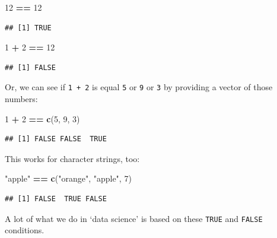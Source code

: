\documentclass[
]{book}
\newenvironment{Shaded}{\begin{snugshade}}{\end{snugshade}}
\newcommand{\DecValTok}[1]{\textcolor[rgb]{0.00,0.00,0.81}{#1}}
\newcommand{\KeywordTok}[1]{\textcolor[rgb]{0.13,0.29,0.53}{\textbf{#1}}}
\newcommand{\NormalTok}[1]{#1}
\newcommand{\OperatorTok}[1]{\textcolor[rgb]{0.81,0.36,0.00}{\textbf{#1}}}
\newcommand{\StringTok}[1]{\textcolor[rgb]{0.31,0.60,0.02}{#1}}
\begin{document}
\begin{Shaded}
\begin{Highlighting}[]
\DecValTok{12} \OperatorTok{==}\StringTok{ }\DecValTok{12}
\end{Highlighting}
\end{Shaded}

\begin{verbatim}
## [1] TRUE
\end{verbatim}

\begin{Shaded}
\begin{Highlighting}[]
\DecValTok{1} \OperatorTok{+}\StringTok{ }\DecValTok{2} \OperatorTok{==}\StringTok{ }\DecValTok{12}
\end{Highlighting}
\end{Shaded}

\begin{verbatim}
## [1] FALSE
\end{verbatim}

Or, we can see if \texttt{1\ +\ 2} is equal \texttt{5} or \texttt{9} or \texttt{3} by providing a vector of those numbers:

\begin{Shaded}
\begin{Highlighting}[]
\DecValTok{1} \OperatorTok{+}\StringTok{ }\DecValTok{2} \OperatorTok{==}\StringTok{ }\KeywordTok{c}\NormalTok{(}\DecValTok{5}\NormalTok{, }\DecValTok{9}\NormalTok{, }\DecValTok{3}\NormalTok{)}
\end{Highlighting}
\end{Shaded}

\begin{verbatim}
## [1] FALSE FALSE  TRUE
\end{verbatim}

This works for character strings, too:

\begin{Shaded}
\begin{Highlighting}[]
\StringTok{"apple"} \OperatorTok{==}\StringTok{ }\KeywordTok{c}\NormalTok{(}\StringTok{"orange"}\NormalTok{, }\StringTok{"apple"}\NormalTok{, }\DecValTok{7}\NormalTok{)}
\end{Highlighting}
\end{Shaded}

\begin{verbatim}
## [1] FALSE  TRUE FALSE
\end{verbatim}

A lot of what we do in `data science' is based on these \texttt{TRUE} and \texttt{FALSE} conditions.
\end{document}
